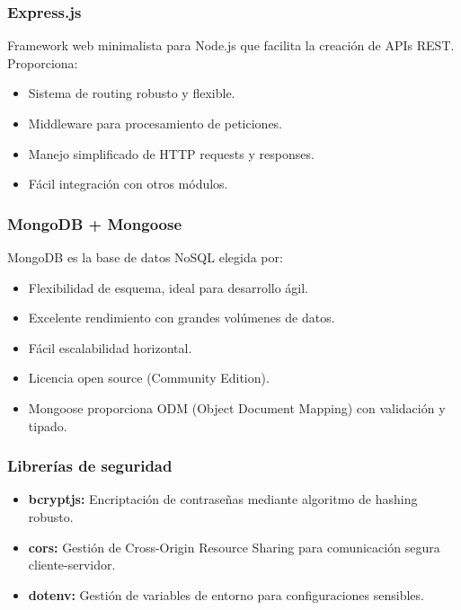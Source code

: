 \documentclass[12pt,a4paper]{article}
\begin{document}
\subsubsection{Express.js}

Framework web minimalista para Node.js que facilita la creación de APIs REST. Proporciona:

\begin{itemize}
    \item Sistema de routing robusto y flexible.
    \item Middleware para procesamiento de peticiones.
    \item Manejo simplificado de HTTP requests y responses.
    \item Fácil integración con otros módulos.
\end{itemize}

\subsubsection{MongoDB + Mongoose}

MongoDB es la base de datos NoSQL elegida por:

\begin{itemize}
    \item Flexibilidad de esquema, ideal para desarrollo ágil.
    \item Excelente rendimiento con grandes volúmenes de datos.
    \item Fácil escalabilidad horizontal.
    \item Licencia open source (Community Edition).
    \item Mongoose proporciona ODM (Object Document Mapping) con validación y tipado.
\end{itemize}

\subsubsection{Librerías de seguridad}

\begin{itemize}
    \item \textbf{bcryptjs:} Encriptación de contraseñas mediante algoritmo de hashing robusto.
    \item \textbf{cors:} Gestión de Cross-Origin Resource Sharing para comunicación segura cliente-servidor.
    \item \textbf{dotenv:} Gestión de variables de entorno para configuraciones sensibles.
\end{itemize}
\end{document}
